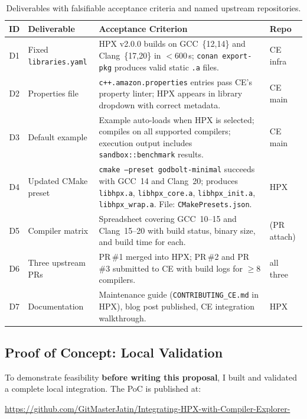 \documentclass[11pt, a4paper]{article}
\newcommand{\code}[1]{\texttt{#1}}
\newcommand{\cefile}[1]{\texttt{#1}}
\begin{document}
\begin{table}[H]
\centering\small
\begin{tabularx}{\linewidth}{@{}clXl@{}}
\toprule
\textbf{ID} & \textbf{Deliverable} & \textbf{Acceptance Criterion}
  & \textbf{Repo} \\
\midrule
\rowcolor{rowgray}
D1 & Fixed \code{libraries.yaml} &
  HPX v2.0.0 builds on GCC~\{12,14\} and Clang~\{17,20\} in $<$600\,s;
  \code{conan export-pkg} produces valid static \code{.a} files.
  & CE infra \\
D2 & Properties file &
  \code{c++.amazon.properties} entries pass CE's property linter;
  HPX appears in library dropdown with correct metadata.
  & CE main \\
\rowcolor{rowgray}
D3 & Default example &
  Example auto-loads when HPX is selected; compiles on all
  supported compilers; execution output includes
  \code{sandbox::benchmark} results.
  & CE main \\
D4 & Updated CMake preset &
  \code{cmake --preset godbolt-minimal} succeeds with GCC~14 and
  Clang~20; produces \code{libhpx.a}, \code{libhpx\_core.a},
  \code{libhpx\_init.a}, \code{libhpx\_wrap.a}.
  File: \cefile{CMakePresets.json}.
  & HPX \\
\rowcolor{rowgray}
D5 & Compiler matrix &
  Spreadsheet covering GCC~10--15 and Clang~15--20 with build
  status, binary size, and build time for each.
  & (PR attach) \\
D6 & Three upstream PRs &
  PR\,\#1 merged into HPX; PR\,\#2 and PR\,\#3 submitted to CE
  with build logs for $\geq$8 compilers.
  & all three \\
\rowcolor{rowgray}
D7 & Documentation &
  Maintenance guide (\cefile{CONTRIBUTING\_CE.md} in HPX),
  blog post published, CE integration walkthrough.
  & HPX \\
\bottomrule
\end{tabularx}
\caption{Deliverables with falsifiable acceptance criteria and named
  upstream repositories.}
\end{table}

\subsection*{Proof of Concept: Local Validation}

To demonstrate feasibility \textbf{before writing this proposal}, I built and
validated a complete local integration.  The PoC is published at:
\begin{center}
\url{https://github.com/GitMasterJatin/Integrating-HPX-with-Compiler-Explorer-}
\end{center}
\end{document}
